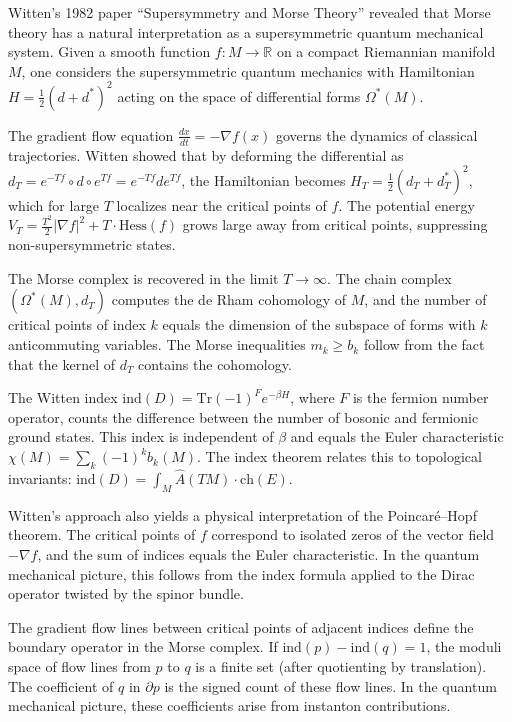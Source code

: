 Witten's 1982 paper ``Supersymmetry and Morse Theory'' revealed that Morse theory has a natural interpretation as a supersymmetric quantum mechanical system. Given a smooth function $f: M \to \mathbb{R}$ on a compact Riemannian manifold $M$, one considers the supersymmetric quantum mechanics with Hamiltonian $H = \frac{1}{2}(d + d^*)^2$ acting on the space of differential forms $\Omega^*(M)$.

The gradient flow equation $\frac{dx}{dt} = -\nabla f(x)$ governs the dynamics of classical trajectories. Witten showed that by deforming the differential as $d_T = e^{-Tf} \circ d \circ e^{Tf} = e^{-Tf}de^{Tf}$, the Hamiltonian becomes $H_T = \frac{1}{2}(d_T + d_T^*)^2$, which for large $T$ localizes near the critical points of $f$. The potential energy $V_T = \frac{T^2}{2}|\nabla f|^2 + T \cdot \text{Hess}(f)$ grows large away from critical points, suppressing non-supersymmetric states.

The Morse complex is recovered in the limit $T \to \infty$. The chain complex $(\Omega^*(M), d_T)$ computes the de Rham cohomology of $M$, and the number of critical points of index $k$ equals the dimension of the subspace of forms with $k$ anticommuting variables. The Morse inequalities $m_k \geq b_k$ follow from the fact that the kernel of $d_T$ contains the cohomology.

The Witten index $\text{ind}(D) = \text{Tr}(-1)^F e^{-\beta H}$, where $F$ is the fermion number operator, counts the difference between the number of bosonic and fermionic ground states. This index is independent of $\beta$ and equals the Euler characteristic $\chi(M) = \sum_{k} (-1)^k b_k(M)$. The index theorem relates this to topological invariants: $\text{ind}(D) = \int_M \widehat{A}(TM) \cdot \text{ch}(E)$.

Witten's approach also yields a physical interpretation of the Poincar\'e--Hopf theorem. The critical points of $f$ correspond to isolated zeros of the vector field $-\nabla f$, and the sum of indices equals the Euler characteristic. In the quantum mechanical picture, this follows from the index formula applied to the Dirac operator twisted by the spinor bundle.

The gradient flow lines between critical points of adjacent indices define the boundary operator in the Morse complex. If $\text{ind}(p) - \text{ind}(q) = 1$, the moduli space of flow lines from $p$ to $q$ is a finite set (after quotienting by translation). The coefficient of $q$ in $\partial p$ is the signed count of these flow lines. In the quantum mechanical picture, these coefficients arise from instanton contributions.

